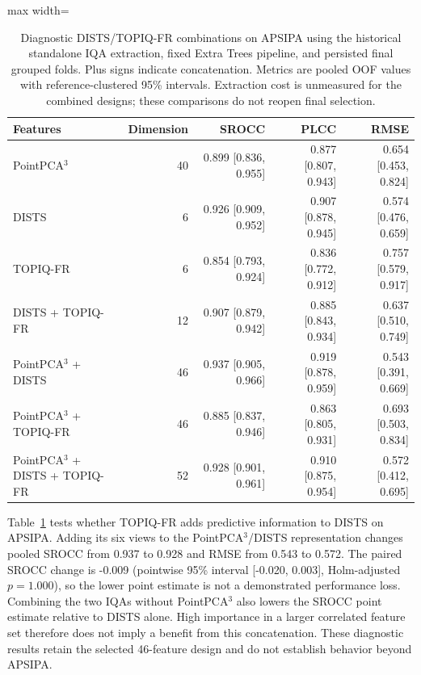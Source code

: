 \documentclass[final,3p,times,twocolumn]{elsarticle}
\begin{document}
\begin{table}[t!]
\centering
\caption{Diagnostic \gls{DISTS}/TOPIQ-FR combinations on APSIPA using the historical standalone IQA extraction, fixed Extra Trees pipeline, and persisted final grouped folds. Plus signs indicate concatenation. Metrics are pooled OOF values with reference-clustered 95\% intervals. Extraction cost is unmeasured for the combined designs; these comparisons do not reopen final selection.}
\label{tab_review_iqa_complementarity}
\scriptsize
    \begin{adjustbox}{max width=\textwidth}
        \begin{tabular}{lrrrr}
        \toprule
        Features & Dimension & SROCC & PLCC & RMSE \\
        \midrule
        PointPCA$^3$ & 40 & 0.899 [0.836, 0.955] & 0.877 [0.807, 0.943] & 0.654 [0.453, 0.824] \\
        DISTS & 6 & 0.926 [0.909, 0.952] & 0.907 [0.878, 0.945] & 0.574 [0.476, 0.659] \\
        TOPIQ-FR & 6 & 0.854 [0.793, 0.924] & 0.836 [0.772, 0.912] & 0.757 [0.579, 0.917] \\
        DISTS + TOPIQ-FR & 12 & 0.907 [0.879, 0.942] & 0.885 [0.843, 0.934] & 0.637 [0.510, 0.749] \\
        PointPCA$^3$ + DISTS & 46 & 0.937 [0.905, 0.966] & 0.919 [0.878, 0.959] & 0.543 [0.391, 0.669] \\
        PointPCA$^3$ + TOPIQ-FR & 46 & 0.885 [0.837, 0.946] & 0.863 [0.805, 0.931] & 0.693 [0.503, 0.834] \\
        PointPCA$^3$ + DISTS + TOPIQ-FR & 52 & 0.928 [0.901, 0.961] & 0.910 [0.875, 0.954] & 0.572 [0.412, 0.695] \\
        \bottomrule
        \end{tabular}
    \end{adjustbox}
\end{table}

Table~\ref{tab_review_iqa_complementarity} tests whether TOPIQ-FR adds predictive information to \gls{DISTS} on APSIPA. Adding its six views to the PointPCA$^3$/DISTS representation changes pooled SROCC from 0.937 to 0.928 and RMSE from 0.543 to 0.572. The paired SROCC change is -0.009 (pointwise 95\% interval [-0.020, 0.003], Holm-adjusted $p=1.000$), so the lower point estimate is not a demonstrated performance loss. Combining the two IQAs without PointPCA$^3$ also lowers the SROCC point estimate relative to \gls{DISTS} alone. High importance in a larger correlated feature set therefore does not imply a benefit from this concatenation. These diagnostic results retain the selected 46-feature design and do not establish behavior beyond APSIPA.
\end{document}
